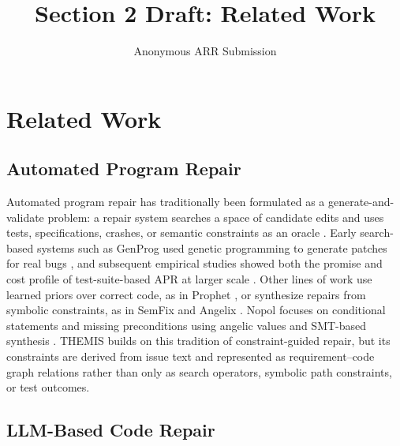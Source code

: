 \documentclass[11pt]{article}
\title{Section 2 Draft: Related Work}
\author{Anonymous ARR Submission}
\begin{document}
\maketitle

\section{Related Work}
\label{sec:related-work}

\subsection{Automated Program Repair}
\label{subsec:apr}

Automated program repair has traditionally been formulated as a generate-and-validate problem: a repair system searches a space of candidate edits and uses tests, specifications, crashes, or semantic constraints as an oracle \citep{monperrus-2018-automatic-repair-bibliography}.  Early search-based systems such as GenProg used genetic programming to generate patches for real bugs \citep{weimer-etal-2009-genprog}, and subsequent empirical studies showed both the promise and cost profile of test-suite-based APR at larger scale \citep{legoues-etal-2012-systematic-apr}.  Other lines of work use learned priors over correct code, as in Prophet \citep{long-rinard-2016-prophet}, or synthesize repairs from symbolic constraints, as in SemFix and Angelix \citep{nguyen-etal-2013-semfix,mechtaev-etal-2016-angelix}.  Nopol focuses on conditional statements and missing preconditions using angelic values and SMT-based synthesis \citep{xuan-etal-2017-nopol}.  THEMIS builds on this tradition of constraint-guided repair, but its constraints are derived from issue text and represented as requirement--code graph relations rather than only as search operators, symbolic path constraints, or test outcomes.

\subsection{LLM-Based Code Repair}
\label{subsec:llm-repair}
\end{document}

